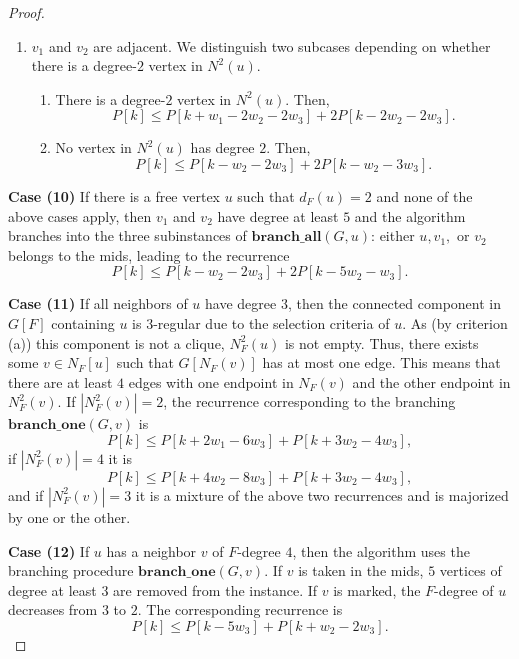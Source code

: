 \documentclass[a4paper,10pt]{article}
\theoremstyle{plain}
\theoremstyle{definition}
\theoremstyle{remark}
\newcommand{\mids}{mids\xspace}
\newcommand{\brancha}{\mathbf{branch\_all}}
\newcommand{\brancho}{\mathbf{branch\_one}}
\begin{document}
\begin{proof}
\begin{enumerate}
\begin{enumerate}
\item $v_1$ and $v_2$ are adjacent. We distinguish two subcases depending on whether there is a degree-$2$ vertex in $N^2(u)$.
\begin{enumerate}
\item There is a degree-$2$ vertex in $N^2(u)$. Then,
\begin{equation}
P[k] \leq P[k+w_1-2w_2-2w_3]+2P[k-2w_2-2w_3].
\end{equation}
\item No vertex in $N^2(u)$ has degree $2$. Then,
\begin{equation}
P[k] \leq P[k-w_2-2w_3]+2P[k-w_2-3w_3].\label{rec:tight2}
\end{equation}
\end{enumerate}
\end{enumerate}
\end{enumerate}

{\bf Case (10)}
If there is a free vertex $u$ such that $d_F(u)=2$ and none of the above cases
apply, then $v_1$ and $v_2$ have degree at least $5$ and the algorithm branches into the 
three subinstances of $\brancha(G,u)$: either $u, v_1,$ or $v_2$ belongs to the \mids, leading to the recurrence
\begin{equation}
P[k] \leq P[k-w_2-2w_3]+2P[k-5w_2-w_3].
\end{equation}

{\bf Case (11)}
If all neighbors of $u$ have degree $3$, then the connected component in $G[F]$ containing 
$u$ is $3$-regular due to the selection criteria of $u$. As (by criterion (a)) this 
component is not a clique, $N_F^2(u)$ is not empty. Thus, there exists some $v\in N_F[u]$ 
such that $G[N_F(v)]$ has at most one edge. This means that there are at least $4$ edges 
with one endpoint in $N_F(v)$ and the other endpoint in $N_F^2(v)$. If $|N_F^2(v)|=2$, the recurrence corresponding to the 
branching $\brancho(G,v)$ is
\begin{equation}
P[k] \leq P[k+2w_1-6w_3]+P[k+3w_2-4w_3],
\end{equation}
if $|N_F^2(v)|=4$ it is
\begin{equation}
P[k] \leq P[k+4w_2-8w_3]+P[k+3w_2-4w_3],\label{rec:tight3}
\end{equation}
and if $|N_F^2(v)|=3$ it is a mixture of the above two recurrences and is majorized by one
or the other.

{\bf Case (12)}
If $u$ has a neighbor $v$ of $F$-degree $4$, then the algorithm uses the branching procedure
$\brancho(G,v)$. If $v$ is taken in the \mids, $5$ vertices of degree at least $3$ are
removed from the instance. If $v$ is marked, the $F$-degree of $u$ decreases from $3$ to $2$. The corresponding recurrence is
\begin{equation}
P[k] \leq P[k-5w_3]+P[k+w_2-2w_3].
\end{equation}


\end{proof}
\end{document}
